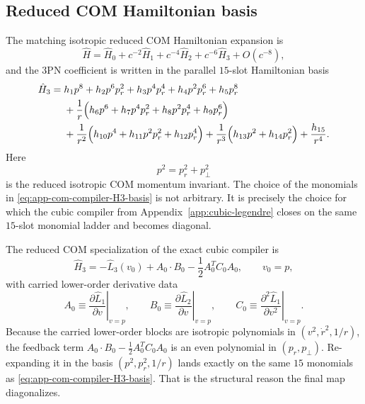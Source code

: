 \documentclass[11pt]{article}
\begin{document}
\subsection{Reduced COM Hamiltonian basis}
\label{app:com-compiler-hamiltonian}

The matching isotropic reduced COM Hamiltonian expansion is
\begin{equation}
\hat H=\hat H_0+c^{-2}\hat H_1+c^{-4}\hat H_2+c^{-6}\hat H_3+O(c^{-8}),
\label{eq:app-com-compiler-H-expansion}
\end{equation}
and the $3$PN coefficient is written in the parallel $15$-slot Hamiltonian
basis
\begin{align}
\hat H_3
={}&
 h_1 p^8 + h_2 p^6p_r^2 + h_3 p^4p_r^4 + h_4 p^2p_r^6 + h_5 p_r^8
\nonumber\\
&
+\frac1r\Bigl(h_6 p^6 + h_7 p^4p_r^2 + h_8 p^2p_r^4 + h_9 p_r^6\Bigr)
\nonumber\\
&
+\frac1{r^2}\Bigl(h_{10} p^4 + h_{11} p^2p_r^2 + h_{12} p_r^4\Bigr)
+\frac1{r^3}\Bigl(h_{13} p^2 + h_{14} p_r^2\Bigr)
+\frac{h_{15}}{r^4}.
\label{eq:app-com-compiler-H3-basis}
\end{align}
Here
\begin{equation}
p^2=p_r^2+p_\perp^2
\label{eq:app-com-compiler-p2}
\end{equation}
is the reduced isotropic COM momentum invariant.  The choice of the monomials in
\eqref{eq:app-com-compiler-H3-basis} is not arbitrary.  It is precisely the
choice for which the cubic compiler from Appendix~\ref{app:cubic-legendre}
closes on the same $15$-slot monomial ladder and becomes diagonal.

The reduced COM specialization of the exact cubic compiler is
\begin{equation}
\hat H_3
=
-\hat L_3(v_0)
+A_0\cdot B_0
-\frac12 A_0^T C_0 A_0,
\qquad
v_0=p,
\label{eq:app-com-compiler-cubic}
\end{equation}
with carried lower-order derivative data
\begin{equation}
A_0\equiv\left.\frac{\partial \hat L_1}{\partial v}\right|_{v=p},
\qquad
B_0\equiv\left.\frac{\partial \hat L_2}{\partial v}\right|_{v=p},
\qquad
C_0\equiv\left.\frac{\partial^2 \hat L_1}{\partial v^2}\right|_{v=p}.
\label{eq:app-com-compiler-ABC}
\end{equation}
Because the carried lower-order blocks are isotropic polynomials in
\((v^2,\dot r^2,1/r)\), the feedback term
\(A_0\cdot B_0-\tfrac12A_0^TC_0A_0\) is an even polynomial in
\((p_r,p_\perp)\).  Re-expanding it in the basis
\((p^2,p_r^2,1/r)\) lands exactly on the same $15$ monomials as
\eqref{eq:app-com-compiler-H3-basis}.  That is the structural reason the final
map diagonalizes.
\end{document}
